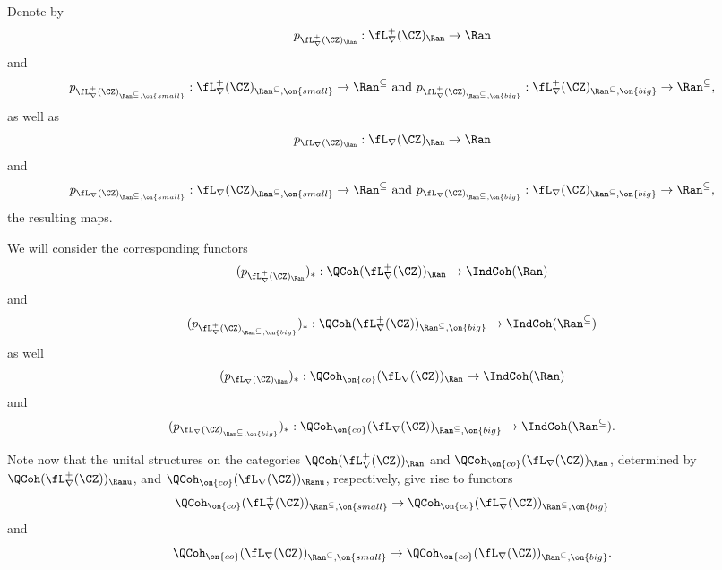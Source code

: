 \documentclass[9pt]{amsart}
\theoremstyle{remark}
\theoremstyle{definition}
\theoremstyle{remark}
\numberwithin{equation}{section}
\begin{document}
\sssec{}

Denote by 
$$p_{\fL^+_\nabla(\CZ)_\Ran}:\fL^+_\nabla(\CZ)_\Ran\to \Ran$$
and 
$$p_{\fL_\nabla^+(\CZ)_{\Ran^{\subseteq},\on{small}}}:\fL_\nabla^+(\CZ)_{\Ran^{\subseteq},\on{small}}\to \Ran^{\subseteq} \text{ and }
p_{\fL_\nabla^+(\CZ)_{\Ran^{\subseteq},\on{big}}}:\fL_\nabla^+(\CZ)_{\Ran^{\subseteq},\on{big}}\to \Ran^{\subseteq},$$
as well as
$$p_{\fL_\nabla(\CZ)_\Ran}:\fL_\nabla(\CZ)_\Ran\to \Ran$$
and 
$$p_{\fL_\nabla(\CZ)_{\Ran^{\subseteq},\on{small}}}:\fL_\nabla(\CZ)_{\Ran^{\subseteq},\on{small}}\to \Ran^{\subseteq} \text{ and }
p_{\fL_\nabla(\CZ)_{\Ran^{\subseteq},\on{big}}}:\fL_\nabla(\CZ)_{\Ran^{\subseteq},\on{big}}\to \Ran^{\subseteq},$$
the resulting maps. 

\medskip

We will consider the corresponding functors
$$(p_{\fL^+_\nabla(\CZ)_\Ran})_*:\QCoh(\fL^+_\nabla(\CZ))_\Ran\to \IndCoh(\Ran)$$
and
$$(p_{\fL^+_\nabla(\CZ)_{\Ran^{\subseteq},\on{big}}})_*:\QCoh(\fL^+_\nabla(\CZ))_{\Ran^{\subseteq},\on{big}}\to \IndCoh(\Ran^{\subseteq})$$
as well 
$$(p_{\fL_\nabla(\CZ)_\Ran})_*:\QCoh_{\on{co}}(\fL_\nabla(\CZ))_\Ran\to \IndCoh(\Ran)$$
and 
$$%
(p_{\fL_\nabla(\CZ)_{\Ran^{\subseteq},\on{big}}})_*:
\QCoh_{\on{co}}(\fL_\nabla(\CZ))_{\Ran^{\subseteq},\on{big}}\to \IndCoh(\Ran^{\subseteq}).$$

\sssec{}

Note now that the unital structures on the categories $\QCoh(\fL^+_\nabla(\CZ))_\Ran$ and 
$\QCoh_{\on{co}}(\fL_\nabla(\CZ))_\Ran$, determined by $\QCoh(\fL^+_\nabla(\CZ))_\Ranu$, 
and $\QCoh_{\on{co}}(\fL_\nabla(\CZ))_\Ranu$, respectively, 
give rise to functors
\begin{equation} \label{e:ins vacuum}
\QCoh_{\on{co}}(\fL^+_\nabla(\CZ))_{\Ran^{\subseteq},\on{small}}\to \QCoh_{\on{co}}(\fL^+_\nabla(\CZ))_{\Ran^{\subseteq},\on{big}}
\end{equation}
and 
\begin{equation} \label{e:ins vacuum punct}
\QCoh_{\on{co}}(\fL_\nabla(\CZ))_{\Ran^{\subseteq},\on{small}}\to \QCoh_{\on{co}}(\fL_\nabla(\CZ))_{\Ran^{\subseteq},\on{big}}.
\end{equation}
\end{document}
